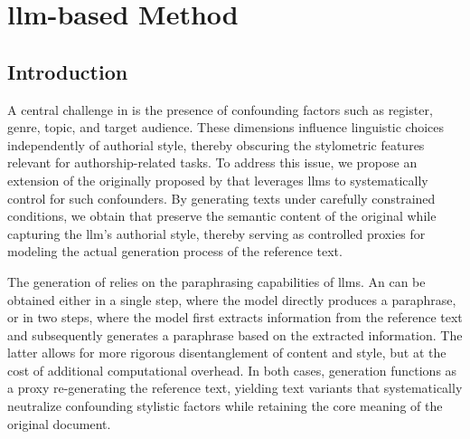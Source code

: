 \chapter{\acs{llm}-based \imp{} Method}
\label{chap:llm_impostor_method}

\section{Introduction}

A central challenge in \ai{} is the presence of confounding factors such as register, genre, topic, and target audience. 
These dimensions influence linguistic choices independently of authorial style, thereby obscuring the stylometric features relevant for authorship-related tasks. 
To address this issue, we propose an extension of the \impAppr{} originally proposed by \citet{koppel_determining_2014} that leverages \acp{llm} to systematically control for such confounders. 
By generating texts under carefully constrained conditions, we obtain \imps{} that preserve the semantic content of the original while capturing the \ac{llm}'s authorial style, thereby serving as controlled proxies for modeling the actual generation process of the reference text.

The generation of \imps{} relies on the paraphrasing capabilities of \acp{llm}. 
An \imp{} can be obtained either in a single step, where the model directly produces a paraphrase, or in two steps, where the model first extracts information from the reference text and subsequently generates a paraphrase based on the extracted information. 
The latter allows for more rigorous disentanglement of content and style, but at the cost of additional computational overhead. 
In both cases, \imp{} generation functions as a proxy re-generating the reference text, yielding text variants that systematically neutralize confounding stylistic factors while retaining the core meaning of the original document.




